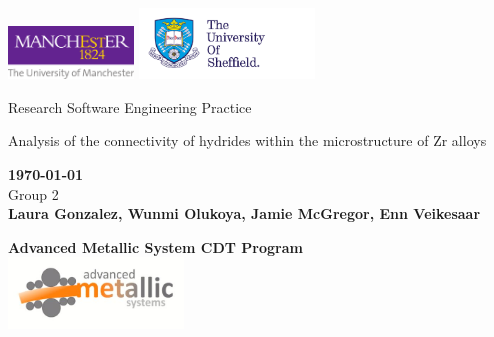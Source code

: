 \thispagestyle{empty} 
\begin{titlepage}
    \centering
    \includegraphics[width=0.25\textwidth]{Figures/Logos/uom_logo.pdf}
    \hspace{170 em}
    \includegraphics[width=0.35\textwidth]{Figures/Logos/Sheffield.pdf}
    \begin{center}
       \vspace*{4cm}
       {\LARGE Research Software Engineering Practice}
       \vspace{3cm}
    \begin{large}   
    

         
         \vspace{0.5cm}

        {\LARGE Analysis of the connectivity of hydrides within the microstructure of Zr alloys} \\

       \vspace{1.5cm}
        
        {\bf \today} \\
                
        
       \vspace{3 cm}
        Group 2 \\
       \textbf{Laura Gonzalez,
       Wunmi Olukoya,
       Jamie McGregor, 
       Enn Veikesaar }\\

       \vfill
       \centering
       
        {\bf \large Advanced Metallic System CDT Program}\\
          
        \includegraphics[width=0.35\textwidth]{Figures/Logos/CDT.JPG}
    
    \end{large}  
   \end{center}
\end{titlepage}